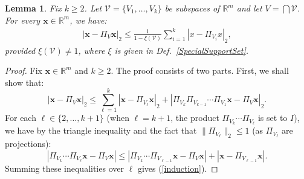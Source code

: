 \documentclass[journal, twocolumn]{IEEEtran}
\newtheorem{lemma}{Lemma}
\begin{document}
\begin{lemma}\label{DistanceToIntersectionLemma}
Fix $k \geq 2$. Let $\mathcal{V} = \{V_1, \ldots, V_k\}$ be subspaces of $\mathbb{R}^m$ and let $V = \bigcap \mathcal{V}$. For every $\mathbf{x} \in \mathbb{R}^m$, we have:
\begin{align}\label{DTILeq}
|\mathbf{x} - \Pi_V \mathbf{x}|_2 \leq \frac{1}{1 - \xi(\mathcal{V})} \sum_{i=1}^k |x - \Pi_{V_i} x|_2,
\end{align}
provided $\xi(\mathcal{V}) \neq 1$, where $\xi$ is given in Def.~\ref{SpecialSupportSet}.
\end{lemma}
\begin{proof} 
Fix $\mathbf{x} \in \mathbb{R}^m$ and $k \geq 2$. The proof consists of two parts. First, we shall show that: 
\begin{equation}\label{induction}
|\mathbf{x} - \Pi_V\mathbf{x}|_2 \leq \sum_{\ell=1}^k |\mathbf{x} - \Pi_{V_{\ell}} \mathbf{x}|_2 + |\Pi_{V_{k}}\Pi_{V_{k-1}}\cdots\Pi_{V_{1}} \mathbf{x} - \Pi_V \mathbf{x}|_2.
\end{equation}
For each $\ell \in \{2, \ldots, k+1\}$ (when $\ell = k+1$, the product $\Pi_{V_k} \cdots \Pi_{V_{\ell}}$ is set to $I$), we have by the triangle inequality and the fact that $\|\Pi_{V_{\ell}}\|_2 \leq 1$ (as $\Pi_{V_{\ell}}$ are projections):
\begin{equation*}
|\Pi_{V_k} \cdots \Pi_{V_{\ell}}\mathbf{x} - \Pi_V \mathbf{x}|  \leq  |\Pi_{V_k} \cdots \Pi_{V_{\ell-1}}\mathbf{x} - \Pi_V \mathbf{x}| + 
|\mathbf{x} - \Pi_{V_{\ell-1}}\mathbf{x}|.
\end{equation*}
Summing these inequalities over $\ell$ gives (\ref{induction}).


\end{proof}
\end{document}
